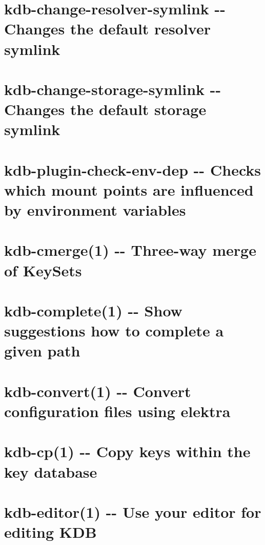 \documentclass[twoside]{book}
\newcommand{\+}{\discretionary{\mbox{\scriptsize$\hookleftarrow$}}{}{}}
\begin{document}
\chapter{kdb-\/change-\/resolver-\/symlink -\/-\/ Changes the default resolver symlink}
\label{doc_help_kdb-change-resolver-symlink_md}

\chapter{kdb-\/change-\/storage-\/symlink -\/-\/ Changes the default storage symlink}
\label{doc_help_kdb-change-storage-symlink_md}

\chapter{kdb-\/plugin-\/check-\/env-\/dep -\/-\/ Checks which mount points are influenced by environment variables}
\label{doc_help_kdb-check-env-dep_md}

\chapter{kdb-\/cmerge(1) -\/-\/ Three-\/way merge of Key\+Sets}
\label{doc_help_kdb-cmerge_md}

\chapter{kdb-\/complete(1) -\/-\/ Show suggestions how to complete a given path}
\label{doc_help_kdb-complete_md}

\chapter{kdb-\/convert(1) -\/-\/ Convert configuration files using elektra}
\label{doc_help_kdb-convert_md}

\chapter{kdb-\/cp(1) -\/-\/ Copy keys within the key database}
\label{doc_help_kdb-cp_md}

\chapter{kdb-\/editor(1) -\/-\/ Use your editor for editing K\+DB}
\label{doc_help_kdb-editor_md}

\end{document}
